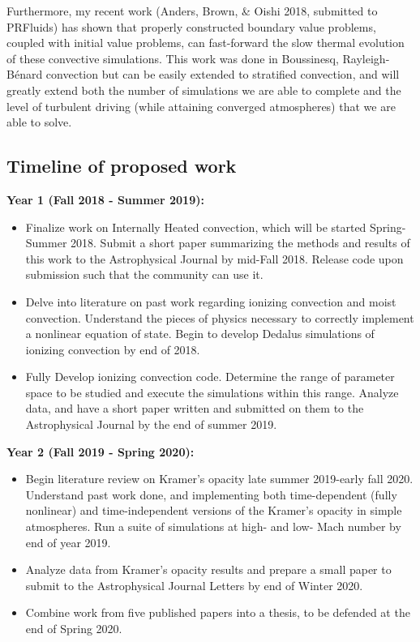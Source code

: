 \documentclass[aasms,12pt]{article}
\newcommand{\RB}{Rayleigh-B\'{e}nard }
\begin{document}
Furthermore, my recent work (Anders, Brown, \& Oishi 2018, submitted to PRFluids) has
shown that properly constructed boundary value problems, coupled with initial value problems,
can fast-forward the slow thermal evolution of these convective simulations.  This work was done in 
Boussinesq, \RB convection but can be easily extended to stratified convection, and will greatly
extend both the number of simulations we are able to complete and the level of turbulent driving
(while attaining converged atmospheres) that we are able to solve.



\subsection{Timeline of proposed work}
\textbf{Year 1 (Fall 2018 - Summer 2019):}
\begin{itemize}
\vspace{-0.2cm}
\item Finalize work on Internally Heated convection, which will be started Spring-Summer 2018.
Submit a short paper summarizing the methods and results of this work to the Astrophysical Journal
by mid-Fall 2018.  Release code upon submission such that the community can use it.
\vspace{-0.2cm}
\item Delve into literature on past work regarding ionizing convection and moist convection.
Understand the pieces of physics necessary to correctly implement a nonlinear equation of state.
Begin to develop Dedalus simulations of ionizing convection by end of 2018.
\vspace{-0.2cm}
\item Fully Develop ionizing convection code.  Determine the range of parameter space to be studied
and execute the simulations within this range.  Analyze data, and have a short paper written and
submitted on them to the Astrophysical Journal by the end of summer 2019.
\end{itemize}

\textbf{Year 2 (Fall 2019 - Spring 2020):}
\begin{itemize}
\vspace{-0.2cm}
\item Begin literature review on Kramer's opacity late summer 2019-early fall 2020.  Understand
past work done, and implementing both time-dependent (fully nonlinear) and time-independent
versions of the Kramer's opacity in simple atmospheres.  Run a suite of simulations at high-
and low- Mach number by end of year 2019.
\vspace{-0.2cm}
\item Analyze data from Kramer's opacity results and prepare a small paper to submit to the
Astrophysical Journal Letters by end of Winter 2020.
\vspace{-0.2cm}
\item Combine work from five published papers into a thesis, to be defended at the end of 
Spring 2020.
\end{itemize}
\end{document}
